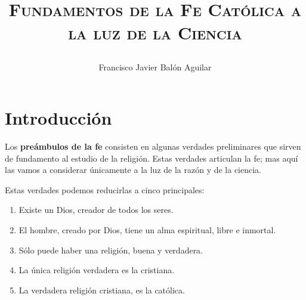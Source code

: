 \documentclass[11pt, twosides, titlepage]{article}
\title{{\scshape\Huge Fundamentos de la Fe Católica a la luz de la Ciencia \par}}
\author{Francisco Javier Balón Aguilar}
\begin{document}
\maketitle
\renewcommand{\contentsname}{Índice de contenidos} %
\tableofcontents %
\newpage

\listoffigures
\newpage

\listoftables
\newpage

\section{Introducción}

    Los \textbf{preámbulos de  la fe} consisten en algunas verdades preliminares que 
    sirven de fundamento al estudio de la religión. Estas verdades articulan la fe; 
    mas aquí las vamos a considerar únicamente a la luz de la razón y de la ciencia.

    Estas verdades podemos reducirlas a cinco principales:

    \begin{enumerate}
        \item Existe un Dios, creador de todos los seres.
        \item El hombre, creado por Dios, tiene un alma espiritual, libre e inmortal.
        \item Sólo puede haber una religión, buena y verdadera.
        \item La única religión verdadera es la cristiana.
        \item La verdadera religión cristiana, es la católica.
    \end{enumerate}
\end{document}
